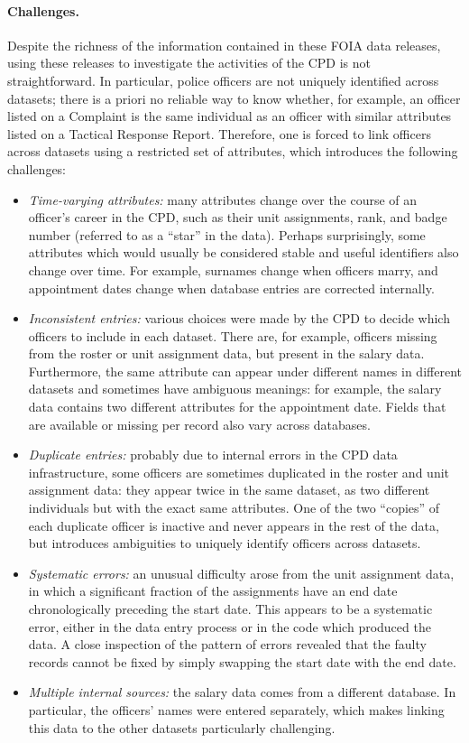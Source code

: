 \paragraph{Challenges.}
Despite the richness of the information contained in these FOIA data releases,
using these releases to investigate  the activities of the CPD is not straightforward. 
In particular, police officers are not uniquely identified across datasets; there is
a priori no reliable way to know whether, for example, an officer listed on
a Complaint is the same individual as an officer with similar attributes listed
on a Tactical Response Report. Therefore, one is forced to link officers
across datasets using a restricted set of attributes, 
which introduces the following challenges:
\begin{itemize}
	\item \emph{Time-varying attributes:} many attributes change over the
		course of an officer's career in the CPD, such as their unit
		assignments, rank, and badge number (referred to as a ``star'' in the data). 
                Perhaps surprisingly, some
		attributes which would usually be considered stable and useful
		identifiers also change over time. For example, surnames change when
		officers marry, and appointment dates change when database entries are
		corrected internally.
	\item \emph{Inconsistent entries:} various choices were made by the CPD to
		decide which officers to include in each dataset.  There are, for
		example, officers missing from the roster or unit assignment data, but
		present in the salary data. Furthermore, the same attribute can appear
		under different names in different datasets and sometimes have
		ambiguous meanings: for example, the salary data contains two different
		attributes for the appointment date. Fields that are available or missing
		per record also vary across databases.
	\item \emph{Duplicate entries:} probably due to internal errors in the CPD
		data infrastructure, some officers are sometimes duplicated in the
		roster and unit assignment data: they appear twice in the same dataset,
		as two different individuals but with the exact same attributes. One of
		the two “copies” of each duplicate officer is inactive and never
		appears in the rest of the data, but introduces ambiguities to uniquely
		identify officers across datasets.
	\item \emph{Systematic errors:} an unusual difficulty arose from the unit
		assignment data, in which a significant fraction of the assignments
		have an end date chronologically preceding the start date. This appears
		to be a systematic error, either in the data entry process or in the
		code which produced the data. A close inspection of the pattern of
		errors revealed that the faulty records cannot be fixed by simply
		swapping the start date with the end date.
	\item \emph{Multiple internal sources:} the salary data comes from
		a different database. In particular, the officers' names were entered
		separately, which makes linking this data to the other datasets
		particularly challenging.
\end{itemize}


